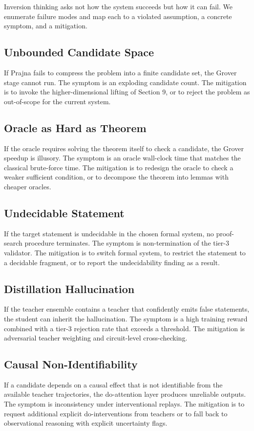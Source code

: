 Inversion thinking asks not how the system succeeds but how it can fail. We enumerate failure modes and map each to a violated assumption, a concrete symptom, and a mitigation.

\subsection{Unbounded Candidate Space}
If Prajna fails to compress the problem into a finite candidate set, the Grover stage cannot run. The symptom is an exploding candidate count. The mitigation is to invoke the higher-dimensional lifting of Section 9, or to reject the problem as out-of-scope for the current system.

\subsection{Oracle as Hard as Theorem}
If the oracle requires solving the theorem itself to check a candidate, the Grover speedup is illusory. The symptom is an oracle wall-clock time that matches the classical brute-force time. The mitigation is to redesign the oracle to check a weaker sufficient condition, or to decompose the theorem into lemmas with cheaper oracles.

\subsection{Undecidable Statement}
If the target statement is undecidable in the chosen formal system, no proof-search procedure terminates. The symptom is non-termination of the tier-3 validator. The mitigation is to switch formal system, to restrict the statement to a decidable fragment, or to report the undecidability finding as a result.

\subsection{Distillation Hallucination}
If the teacher ensemble contains a teacher that confidently emits false statements, the student can inherit the hallucination. The symptom is a high training reward combined with a tier-3 rejection rate that exceeds a threshold. The mitigation is adversarial teacher weighting and circuit-level cross-checking.

\subsection{Causal Non-Identifiability}
If a candidate depends on a causal effect that is not identifiable from the available teacher trajectories, the do-attention layer produces unreliable outputs. The symptom is inconsistency under interventional replays. The mitigation is to request additional explicit do-interventions from teachers or to fall back to observational reasoning with explicit uncertainty flags.


